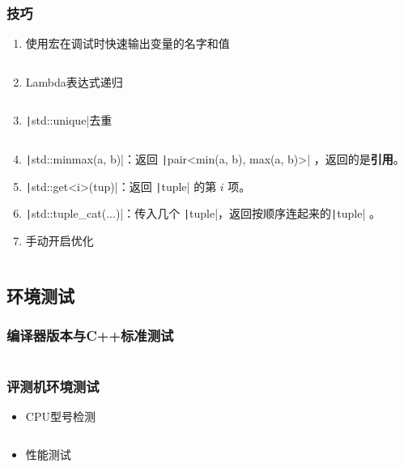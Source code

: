 \documentclass[a4paper, twoside]{article}
\begin{document}
    \subsubsection{技巧}
    \begin{enumerate}
        \item 使用宏在调试时快速输出变量的名字和值
        \inputminted{cpp}{../src/附录/C++/debug宏.cpp}
        \item Lambda表达式递归
        \inputminted{cpp}{../src/附录/C++/Lambda表达式递归.cpp}
        \item \texttt|std::unique|去重
        \inputminted{cpp}{../src/附录/C++/std::unique去重.cpp}
        \item \texttt|std::minmax(a, b)|：返回 \texttt|pair<min(a, b), max(a, b)>| ，返回的是\textbf{引用}。
        \item \texttt|std::get<i>(tup)|：返回 \texttt|tuple| 的第 $i$ 项。
        \item \texttt|std::tuple_cat(...)|：传入几个 \texttt|tuple|，返回按顺序连起来的\texttt|tuple| 。
        \item 手动开启优化
        \inputminted{cpp}{../src/附录/C++/手动开启优化.cpp}

    \end{enumerate}
    


\subsection{环境测试}
    \subsubsection{编译器版本与C++标准测试}
    \inputminted{cpp}{../src/附录/环境测试/编译器版本与C++标准测试.cpp}

    \subsubsection{评测机环境测试}
    \begin{itemize}
        \item CPU型号检测
        \inputminted{cpp}{../src/附录/环境测试/CPU型号检测.cpp}
        \item 性能测试
        \inputminted{cpp}{../src/附录/环境测试/性能测试.cpp}
    \end{itemize}
\end{document}
